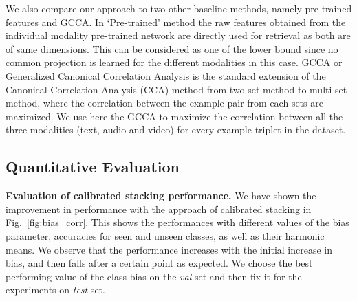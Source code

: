 We also compare our approach to two other baseline methods, namely pre-trained features and GCCA. In `Pre-trained' method the raw features obtained from the individual modality pre-trained network are directly used for retrieval as both are of same dimensions. This can be considered as one of the lower bound since no common projection is learned for the different modalities in this case. GCCA \cite{kettenring1971canonical} or Generalized Canonical Correlation Analysis is the standard extension of the Canonical Correlation Analysis (CCA) method from two-set method to multi-set method, where the correlation between the example pair from each sets are maximized. We use here the GCCA to maximize the correlation between all the three modalities (text, audio and video) for every example triplet in the dataset.


\subsection{Quantitative Evaluation}
\label{sec:quant}
\noindent
\textbf{Evaluation of calibrated stacking performance.} 
We have shown the improvement in performance with the approach of calibrated stacking in
Fig.~\ref{fig:bias_corr}. This shows the performances with different values of the bias parameter, \ie accuracies for seen and unseen classes, as well as their harmonic means.
We observe that the performance increases with the initial increase in bias, and then falls after a certain point as expected. We choose the best performing value of the class bias on the \emph{val} set and then fix it for the experiments on \emph{test} set.

